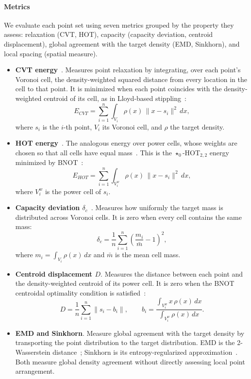 \documentclass{egpubl}
\begin{document}
\paragraph{Metrics}
\label{sec:metrics}

We evaluate each point set using seven metrics grouped by the property they assess: relaxation (CVT, HOT), capacity (capacity deviation, centroid displacement), global agreement with the target density (EMD, Sinkhorn), and local spacing (spatial measure).



\begin{itemize}

\item \textbf{CVT energy}~\cite{Du1999CVT}. Measures point relaxation by integrating, over each point's Voronoi cell, the density-weighted squared distance from every location in the cell to that point. It is minimized when each point coincides with the density-weighted centroid of its cell, as in Lloyd-based stippling~\cite{10.1145/508530.508537}:
$$
E_{CVT}=\sum_{i=1}^{n}\int_{V_i}\rho(x)\,\|x-s_i\|^2\,dx ,
$$
where $s_i$ is the $i$-th point, $V_i$ its Voronoi cell, and $\rho$ the target density.

\item \textbf{HOT energy}~\cite{Mullen2011HOT}. The analogous energy over power cells, whose weights are chosen so that all cells have equal mass~\cite{Aurenhammer1987Power}. This is the $\star_0$-HOT$_{2,2}$ energy minimized by BNOT~\cite{deGoes:2012:BNOT}:
$$
E_{HOT}=\sum_{i=1}^{n}\int_{V^w_i}\rho(x)\,\|x-s_i\|^2\,dx ,
$$
where $V^w_i$ is the power cell of $s_i$.

\item \textbf{Capacity deviation $\delta_c$}~\cite{10.1145/1576246.1531392}. Measures how uniformly the target mass is distributed across Voronoi cells. It is zero when every cell contains the same mass:
$$
\delta_c=\frac{1}{n}\sum_{i=1}^{n}\left(\frac{m_i}{\bar{m}}-1\right)^2 ,
$$
where $m_i=\int_{V_i}\rho(x)\,dx$ and $\bar{m}$ is the mean cell mass.

\item \textbf{Centroid displacement $D$}. Measures the distance between each point and the density-weighted centroid of its power cell. It is zero when the BNOT centroidal optimality condition is satisfied~\cite{deGoes:2012:BNOT}:
$$
D=\frac{1}{n}\sum_{i=1}^{n}\|s_i-b_i\|,\qquad
b_i=\frac{\int_{V^w_i}x\,\rho(x)\,dx}{\int_{V^w_i}\rho(x)\,dx}.
$$
\item \textbf{EMD and Sinkhorn}. Measure global agreement with the target density by transporting the point distribution to the target distribution. EMD is the 2-Wasserstein distance~\cite{Villani2009OT}; Sinkhorn is its entropy-regularized approximation~\cite{cuturi2013sinkhorndistanceslightspeedcomputation}. Both measure global density agreement without directly assessing local point arrangement.


\end{itemize}
\end{document}
